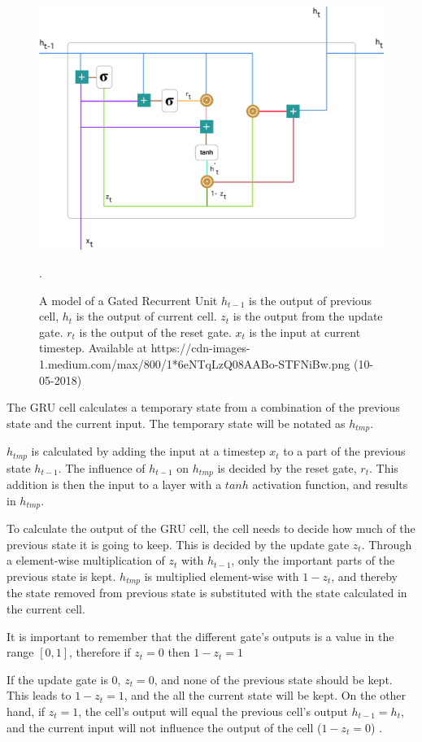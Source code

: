 \begin{figure}[H]
    \centering
    \includegraphics[width=\textwidth]{Assets/Chapter2_Theory/GRU-cell.png}
    \caption{A model of a Gated Recurrent Unit $h_{t-1}$ is the output of previous cell, $h_t$ is the output of current cell. $z_t$ is the output from the update gate. $r_t$ is the output of the reset gate. $x_t$ is the input at current timestep. Available at https://cdn-images-1.medium.com/max/800/1*6eNTqLzQ08AABo-STFNiBw.png (10-05-2018) \cite{kostadinov_understanding_2017}}.  
    \label{fig:gru-single-cell}
\end{figure}

The GRU cell calculates a temporary state from a combination of the previous state and the current input. The temporary state will be notated as $h_{tmp}$.

$h_{tmp}$ is calculated by adding the input at a timestep $x_t$ to a part of the previous state $h_{t-1}$. The influence of $h_{t-1}$ on $h_{tmp}$ is decided by the reset gate, $r_t$. This addition is then the input to a layer with a $tanh$ activation function, and results in $h_{tmp}$.

To calculate the output of the GRU cell, the cell needs to decide how much of the previous state it is going to keep. This is decided by the update gate $z_t$. Through a element-wise multiplication of $z_t$ with $h_{t-1}$, only the important parts of the previous state is kept. $h_{tmp}$ is multiplied element-wise with $1 - z_t$, and thereby the state removed from previous state is substituted with the state calculated in the current cell.

It is important to remember that the different gate's outputs is a value in the range $[0, 1]$, therefore if $z_t = 0$ then $1 - z_t = 1$

If the update gate is 0, $z_t = 0$, and none of the previous state should be kept. This leads to $1 - z_t = 1$, and the all the current state will be kept. On the other hand, if $z_t = 1$, the cell's output will equal the previous cell's output $h_{t-1} = h_t$, and the current input will not influence the output of the cell ($1 - z_t = 0$) \cite{kostadinov_understanding_2017}.